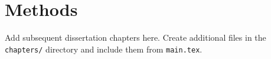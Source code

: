 \chapter{Methods}

Add subsequent dissertation chapters here. Create additional files in the \texttt{chapters/} directory and include them from \texttt{main.tex}.
